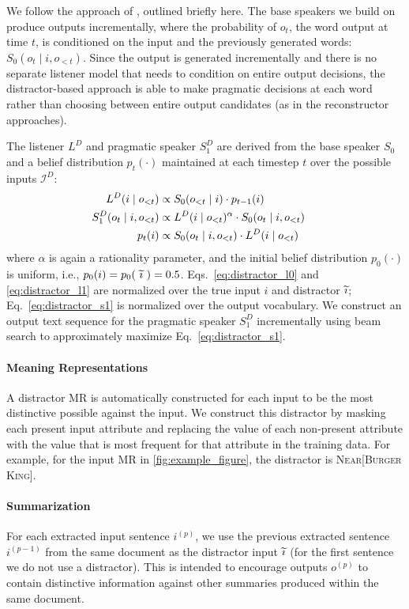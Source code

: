\documentclass[11pt,a4paper]{article}
\newcommand{\distr}[0]{\ensuremath\widetilde\imath}
\newcommand{\ie}{i.e., }
\begin{document}
We follow the approach of , outlined briefly here.
The base speakers we build on produce outputs incrementally, where the probability of $o_t$, the word output at time $t$, is conditioned on the input and the previously generated words: $S_0(o_t \mid i, o_{<t})$.
Since the output is generated incrementally and there is no separate listener model that needs to condition on entire output decisions, the distractor-based approach is able to 
make pragmatic decisions at each word rather than choosing between entire output candidates (as in the reconstructor approaches).

The listener $L^D$ and pragmatic speaker $S_1^D$ are derived from the base speaker $S_0$ and a belief  distribution $p_t(\cdot)$ maintained at each timestep $t$ over the possible inputs $\mathcal{I}^D$:
{\begin{align}
\label{eq:distractor_l0}
L^D(i \mid o_{<t}) &\propto S_0(o_{<t} \mid i) \cdot p_{t-1}(i) \\
\label{eq:distractor_s1}
\hspace{-13pt} S^D_1(o_t \mid i, o_{<t}) &\propto L^D(i \mid o_{<t})^\alpha \cdot S_0(o_t \mid i, o_{<t}) \\
\label{eq:distractor_l1}
p_{t}(i) &\propto S_0(o_t \mid i, o_{<t}) \cdot L^D(i \mid o_{<t})
\end{align}
}where $\alpha$ is again a rationality parameter, and the initial belief distribution $p_0(\cdot)$ is uniform, \ie $p_0(i) = p_0(~\distr~) = 0.5$. Eqs.\ \ref{eq:distractor_l0} and \ref{eq:distractor_l1} are normalized over the true input $i$ and distractor $\distr$; 
Eq.\ \ref{eq:distractor_s1} is normalized over the output vocabulary. We construct an output text sequence for the pragmatic speaker $S^D_1$ incrementally using beam search to approximately maximize Eq.\ \ref{eq:distractor_s1}.

\paragraph{Meaning Representations}
A distractor MR is automatically constructed for each input to be the most distinctive possible against the input. We construct this distractor by masking each present input attribute and replacing the value of each non-present attribute with the value that is most frequent for that attribute in the training data. For example, for the input MR in \autoref{fig:example_figure}, the distractor is \textsc{Near[Burger King]}. 

\paragraph{Summarization}
For each extracted input sentence $i^{(p)}$, we use the previous extracted sentence $i^{(p-1)}$ 
from the same document as the distractor input $\distr$ (for the first sentence we do not use a distractor).  
This is intended to encourage outputs $o^{(p)}$ to contain distinctive information 
against other summaries produced 
within the same document.
\end{document}
